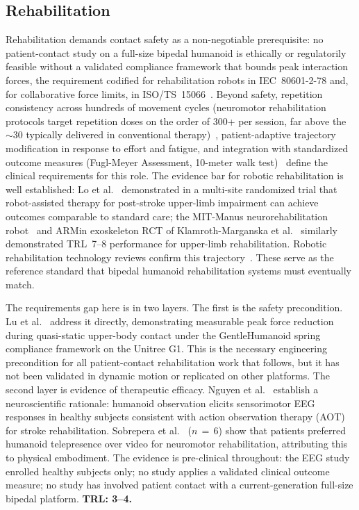 \subsection{Rehabilitation}
\label{sec:rehabilitation}

Rehabilitation demands contact safety as a non-negotiable prerequisite: no
patient-contact study on a full-size bipedal humanoid is ethically or
regulatorily feasible without a validated compliance framework that bounds peak
interaction forces, the requirement codified for rehabilitation robots in
IEC~80601-2-78 and, for collaborative force limits, in
ISO/TS~15066~\cite{iec80601_2_78,isots15066,yang2017medical}. Beyond safety, repetition consistency across hundreds of
movement cycles (neuromotor rehabilitation protocols target repetition doses on
the order of 300+ per session, far above the $\sim$30 typically delivered in
conventional therapy)~\cite{lang2009observation,birkenmeier2010translating},
patient-adaptive trajectory modification in response to
effort and fatigue, and integration with standardized outcome measures
(Fugl-Meyer Assessment, 10-meter walk
test)~\cite{fuglmeyer1975poststroke,winstein2016guidelines} define the clinical
requirements for this role. The evidence bar for robotic rehabilitation is well established:
Lo et al.~\cite{lo2010robot} demonstrated in a multi-site randomized trial that
robot-assisted therapy for post-stroke upper-limb impairment can achieve
outcomes comparable to standard care; the MIT-Manus neurorehabilitation
robot~\cite{krebs1998robot} and ARMin exoskeleton RCT of
Klamroth-Marganska et al.~\cite{klamroth2014armin} similarly demonstrated
TRL~7--8 performance for upper-limb rehabilitation. Robotic rehabilitation
technology reviews confirm this trajectory~\cite{poli2013robotic}. These serve
as the reference standard that bipedal humanoid rehabilitation systems must
eventually match.

The requirements gap here is in two layers. The first is the safety precondition.
Lu et al.~\cite{lu2025gentlehumanoid} address it directly, demonstrating
measurable peak force reduction during quasi-static upper-body contact under the
GentleHumanoid spring compliance framework on the Unitree G1. This is the
necessary engineering precondition for all patient-contact rehabilitation work
that follows, but it has not been validated in dynamic motion or replicated on
other platforms. The second layer is evidence of therapeutic efficacy. Nguyen et
al.~\cite{nguyen2024eeg} establish a neuroscientific rationale: humanoid
observation elicits sensorimotor EEG responses in healthy subjects consistent with
action observation therapy (AOT) for stroke rehabilitation. Sobrepera et
al.~\cite{sobrepera2022feasibility} ($n\,=\,6$) show that patients preferred
humanoid telepresence over video for neuromotor rehabilitation, attributing this
to physical embodiment. The evidence is pre-clinical throughout: the EEG study
enrolled healthy subjects only; no study applies a validated clinical outcome
measure; no study has involved patient contact with a current-generation full-size
bipedal platform. \textbf{TRL: 3--4.}

